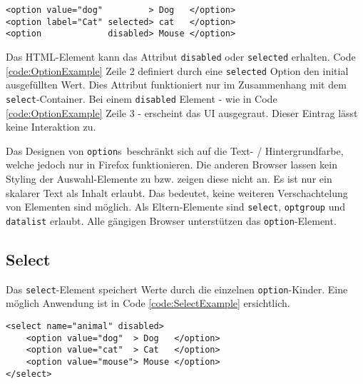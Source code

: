 \begin{lstlisting}[style = htmlcssjs, caption = Option Example, label = code:OptionExample]
<option value="dog"         > Dog   </option>
<option label="Cat" selected> cat   </option>
<option             disabled> Mouse </option>
\end{lstlisting}    

Das HTML-Element kann das Attribut \texttt{disabled} oder \texttt{selected} erhalten.
Code \ref{code:OptionExample} Zeile 2 definiert durch eine \texttt{selected} Option den initial ausgefüllten Wert.
Dies Attribut funktioniert nur im Zusammenhang mit dem \texttt{select}-Container. 
Bei einem \texttt{disabled} Element - wie in Code \ref{code:OptionExample} Zeile 3 - erscheint das UI ausgegraut.
Dieser Eintrag lässt keine Interaktion zu.

Das Designen von \texttt{option}s\footnotemark \ beschränkt sich auf die Text- / Hintergrundfarbe, welche jedoch nur in Firefox funktionieren. 
Die anderen Browser lassen kein Styling der Auswahl-Elemente zu bzw. zeigen diese nicht an.
Es ist nur ein skalarer Text als Inhalt erlaubt. 
Das bedeutet, keine weiteren Verschachtelung von Elementen sind möglich.
Als Eltern-Elemente sind \texttt{select}, \texttt{optgroup} und \texttt{datalist} erlaubt.
Alle gängigen Browser unterstützen das \texttt{option}-Element.


\subsection{Select}
\label{sec:select}

Das \texttt{select}-Element speichert Werte durch die einzelnen \texttt{option}-Kinder.
Eine möglich Anwendung ist in Code \ref{code:SelectExample} ersichtlich.

\begin{lstlisting}[style = htmlcssjs, caption = Disabled Select Example, label = code:SelectExample]
<select name="animal" disabled>
    <option value="dog"  > Dog   </option>
    <option value="cat"  > Cat   </option>
    <option value="mouse"> Mouse </option>
</select>
\end{lstlisting}


